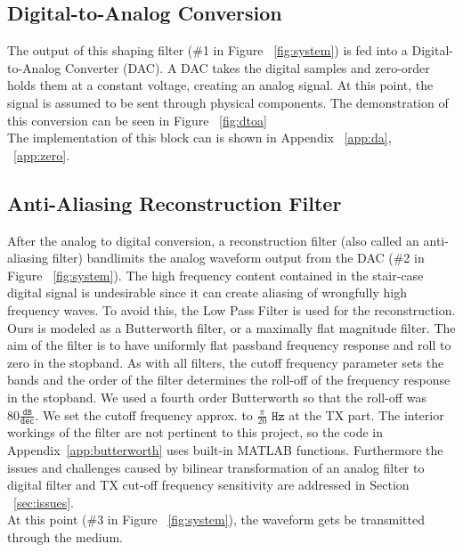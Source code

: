 \documentclass[]{article}
\begin{document}
\subsection{Digital-to-Analog Conversion}
\label{sec:da}

The output of this shaping filter (\#1 in Figure ~\ref{fig:system}) is fed into a Digital-to-Analog Converter (DAC).  A DAC takes the digital samples and zero-order holds them at a constant voltage, creating an analog signal. At this point, the signal is assumed to be sent through physical components. The demonstration of this conversion can be seen in Figure ~\ref{fig:dtoa} \\

The implementation of this block can is shown in Appendix ~\ref{app:da}, ~\ref{app:zero}.

\subsection{Anti-Aliasing Reconstruction Filter}
\label{sec:reconstruction}
After the analog to digital conversion, a reconstruction filter (also called an anti-aliasing filter) bandlimits the analog waveform output from the DAC (\#2 in Figure ~\ref{fig:system}).  The high frequency content contained in the stair-case digital signal is undesirable since it can create aliasing of wrongfully high frequency waves. To avoid this, the Low Pass Filter is used for the reconstruction.  Ours is modeled as a Butterworth filter, or a maximally flat magnitude filter.  The aim of the filter is to have uniformly flat passband frequency response and roll to zero in the stopband.  As with all filters, the cutoff frequency parameter sets the bands and the order of the filter determines the roll-off of the frequency response in the stopband.  We used a fourth order Butterworth so that the roll-off was $80 \mathtt{\frac{dB}{dec}}$.  We set the cutoff frequency approx. to $\frac{\pi}{20}$ $\mathtt{Hz}$ at the TX part. The interior workings of the filter are not pertinent to this project, so the code in Appendix~\ref{app:butterworth} uses built-in MATLAB functions. Furthermore the issues and challenges caused by bilinear transformation of an analog filter to digital filter and TX cut-off frequency sensitivity are addressed in Section ~\ref{sec:issues}. \\

At this point (\#3 in Figure ~\ref{fig:system}), the waveform gets be transmitted through the medium. \\
\end{document}
